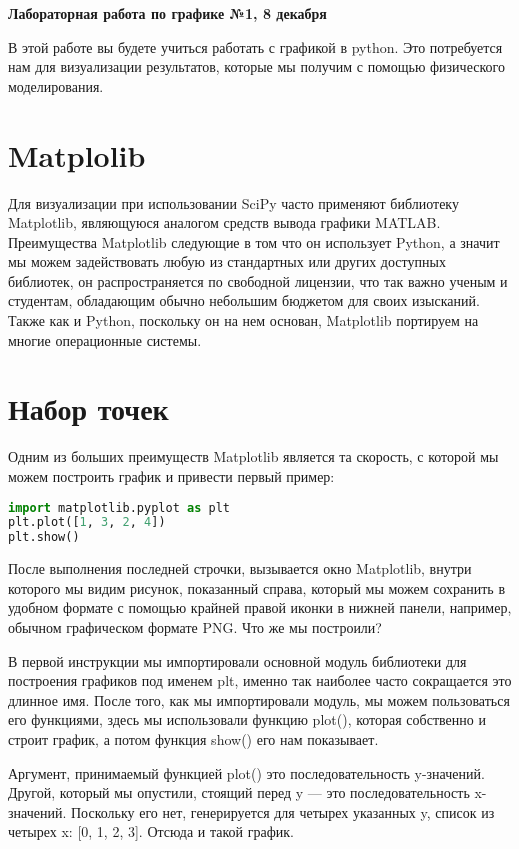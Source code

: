 \documentclass[a4paper,12pt]{article}
\begin{document}
\begin{center}
\Large{\textbf{Лабораторная работа по графике №1, 8 декабря}}
\end{center}
В этой работе вы будете учиться работать с графикой в python. Это потребуется нам для визуализации результатов, которые мы получим с помощью физического моделирования.

\section{Matplolib}
Для визуализации при использовании SciPy часто применяют библиотеку Matplotlib, являющуюся аналогом средств вывода графики MATLAB. Преимущества Matplotlib следующие в том что он использует Python, а значит мы можем задействовать любую из стандартных или других доступных библиотек, он распространяется по свободной лицензии, что так важно ученым и студентам, обладающим обычно небольшим бюджетом для своих изысканий. Также как и Python, поскольку он на нем основан, Matplotlib портируем на многие операционные системы.
\section{Набор точек}
Одним из больших преимуществ Matplotlib является та скорость, с которой мы можем построить график и привести первый пример:
\begin{lstlisting}[language=python]
import matplotlib.pyplot as plt
plt.plot([1, 3, 2, 4])
plt.show()
\end{lstlisting}
После выполнения последней строчки, вызывается окно Matplotlib, внутри которого мы видим рисунок, показанный справа, который мы можем сохранить в удобном формате с помощью крайней правой иконки в нижней панели, например, обычном графическом формате PNG. Что же мы построили?

В первой инструкции мы импортировали основной модуль библиотеки для построения графиков под именем plt, именно так наиболее часто сокращается это длинное имя. После того, как мы импортировали модуль, мы можем пользоваться его функциями, здесь мы использовали функцию plot(), которая собственно и строит график, а потом функция show() его нам показывает.

Аргумент, принимаемый функцией plot() это последовательность y-значений. Другой, который мы опустили, стоящий перед y --- это последовательность x-значений. Поскольку его нет, генерируется для четырех указанных y, список из четырех x: [0, 1, 2, 3]. Отсюда и такой график.
\end{document}
